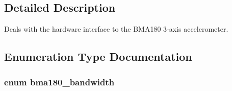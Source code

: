 \subsection{\-Detailed \-Description}
\-Deals with the hardware interface to the \-B\-M\-A180 3-\/axis accelerometer. 

\subsection{\-Enumeration \-Type \-Documentation}
\hypertarget{group___p_i_o_s___b_m_a180_gacd6d3ecff286f705778973637b4d3d99}{
\subsubsection[{bma180\-\_\-bandwidth}]{\setlength{\rightskip}{0pt plus 5cm}enum {\bf bma180\-\_\-bandwidth}}}\label{group___p_i_o_s___b_m_a180_gacd6d3ecff286f705778973637b4d3d99}
